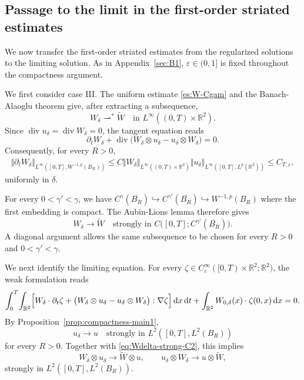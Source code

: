 \documentclass[reqno,11pt,a4paper]{amsart}
\newcommand{\dd}{\mathrm{d}}
\begin{document}
\subsection{Passage to the limit in the first-order striated estimates}
\label{sec:B2}

We now transfer the first-order striated estimates from the
regularized solutions to the limiting solution.
As in Appendix~\ref{sec:B1}, $\varepsilon\in(0,1]$ is fixed
throughout the compactness argument.

We first consider case III.
The uniform estimate \eqref{es:W-Cgam} and the
Banach-Alaoglu theorem give, after extracting a subsequence,
\[
  W_\delta\rightharpoonup^\ast\widetilde W
  \quad\text{in }
  L^\infty((0,T)\times\mathbb R^2).
\]
Since $\operatorname{div}u_\delta
=\operatorname{div}W_\delta=0$, the tangent equation reads
\[
  \partial_tW_\delta
  +\operatorname{div}
  \bigl(W_\delta\otimes u_\delta-u_\delta\otimes W_\delta\bigr)
  =0.
\]
Consequently, for every $R>0$,
\begin{align*}
  \Vert \partial_tW_\delta\Vert _
    {L^\infty([0,T],W^{-1,p}(B_R))}
  \leq
  C\Vert W_\delta\Vert _{L^\infty((0,T)\times\mathbb R^2)}
  \Vert u_\delta\Vert _{L^\infty([0,T],L^p(\mathbb R^2))}
  \leq C_{T,\varepsilon},
\end{align*}
uniformly in $\delta$.

For every $0<\gamma'<\gamma$, we have
$C^\gamma(\overline{B_R})
  \hookrightarrow C^{\gamma'}(\overline{B_R})
  \hookrightarrow W^{-1,p}(B_R)$ where the first embedding is compact.
The Aubin-Lions lemma therefore gives
\begin{equation}\label{eq:Wdelta-strong-C2}
  W_\delta\longrightarrow\widetilde W
  \quad\text{strongly in }
  C\bigl([0,T];C^{\gamma'}(\overline{B_R})\bigr).
\end{equation}
A diagonal argument allows the same subsequence to be chosen
for every $R>0$ and $0<\gamma'<\gamma$.

We next identify the limiting equation.
For every
$\zeta\in C_c^\infty([0,T)\times\mathbb R^2;\mathbb R^2)$,
the weak formulation reads
\begin{align*}
  \int_0^T\!\int_{\mathbb R^2}
  \Bigl[
    W_\delta\cdot\partial_t\zeta
    +\bigl(
      W_\delta\otimes u_\delta
      -u_\delta\otimes W_\delta
    \bigr):\nabla\zeta
  \Bigr]\,\dd x\,\dd t
  +
  \int_{\mathbb R^2}
  W_{0,\delta}(x)\cdot\zeta(0,x)\,\dd x=0.
\end{align*}
By Proposition~\ref{prop:compactness-main1},
\[
  u_\delta\longrightarrow u
  \quad\text{strongly in }
  L^2([0,T],L^2(B_R))
\]
for every $R>0$.
Together with \eqref{eq:Wdelta-strong-C2}, this implies
\[
  W_\delta\otimes u_\delta
  \longrightarrow\widetilde W\otimes u,
  \qquad
  u_\delta\otimes W_\delta
  \longrightarrow u\otimes\widetilde W,
\]
strongly in $L^2([0,T],L^2(B_R))$.
\end{document}
